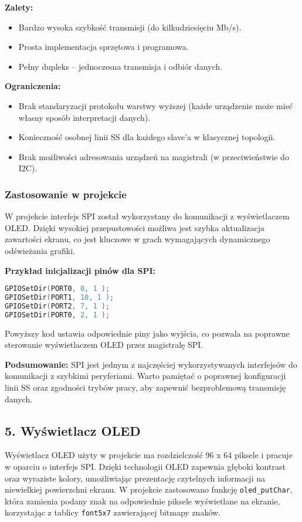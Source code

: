 \documentclass[a4paper,12pt]{report}
\begin{document}
\textbf{Zalety:}
\begin{itemize}
    \item Bardzo wysoka szybkość transmisji (do kilkudziesięciu Mb/s).
    \item Prosta implementacja sprzętowa i programowa.
    \item Pełny dupleks – jednoczesna transmisja i odbiór danych.
\end{itemize}

\textbf{Ograniczenia:}
\begin{itemize}
    \item Brak standaryzacji protokołu warstwy wyższej (każde urządzenie może mieć własny sposób interpretacji danych).
    \item Konieczność osobnej linii SS dla każdego slave'a w klasycznej topologii.
    \item Brak możliwości adresowania urządzeń na magistrali (w przeciwieństwie do I2C).
\end{itemize}

\subsubsection*{Zastosowanie w projekcie}

W projekcie interfejs SPI został wykorzystany do komunikacji z wyświetlaczem OLED. Dzięki wysokiej przepustowości możliwa jest szybka aktualizacja zawartości ekranu, co jest kluczowe w grach wymagających dynamicznego odświeżania grafiki.

\textbf{Przykład inicjalizacji pinów dla SPI:}
\begin{lstlisting}[language=C]
GPIOSetDir(PORT0, 0, 1 );
GPIOSetDir(PORT1, 10, 1 );
GPIOSetDir(PORT2, 7, 1 );
GPIOSetDir(PORT0, 2, 1 );
\end{lstlisting}
Powyższy kod ustawia odpowiednie piny jako wyjścia, co pozwala na poprawne sterowanie wyświetlaczem OLED przez magistralę SPI.

\textbf{Podsumowanie:}  
SPI jest jednym z najczęściej wykorzystywanych interfejsów do komunikacji z szybkimi peryferiami. Warto pamiętać o poprawnej konfiguracji linii SS oraz zgodności trybów pracy, aby zapewnić bezproblemową transmisję danych.

\subsection*{5. Wyświetlacz OLED}

Wyświetlacz OLED użyty w projekcie ma rozdzielczość 96 x 64 piksele i pracuje w oparciu o interfejs SPI. Dzięki technologii OLED zapewnia głęboki kontrast oraz wyraziste kolory, umożliwiając prezentację czytelnych informacji na niewielkiej powierzchni ekranu. W projekcie zastosowano funkcję \texttt{oled\_putChar}, która zamienia podany znak na odpowiednie piksele wyświetlane na ekranie, korzystając z tablicy \texttt{font5x7} zawierającej bitmapy znaków.
\end{document}
